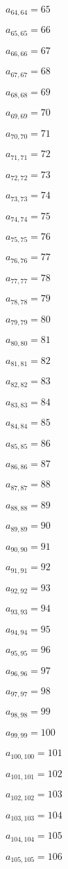 \documentclass[a4paper,12pt]{article}
\begin{document}
$a _{ 64, 64 } = 65$

$a _{ 65, 65 } = 66$

$a _{ 66, 66 } = 67$

$a _{ 67, 67 } = 68$

$a _{ 68, 68 } = 69$

$a _{ 69, 69 } = 70$

$a _{ 70, 70 } = 71$

$a _{ 71, 71 } = 72$

$a _{ 72, 72 } = 73$

$a _{ 73, 73 } = 74$

$a _{ 74, 74 } = 75$

$a _{ 75, 75 } = 76$

$a _{ 76, 76 } = 77$

$a _{ 77, 77 } = 78$

$a _{ 78, 78 } = 79$

$a _{ 79, 79 } = 80$

$a _{ 80, 80 } = 81$

$a _{ 81, 81 } = 82$

$a _{ 82, 82 } = 83$

$a _{ 83, 83 } = 84$

$a _{ 84, 84 } = 85$

$a _{ 85, 85 } = 86$

$a _{ 86, 86 } = 87$

$a _{ 87, 87 } = 88$

$a _{ 88, 88 } = 89$

$a _{ 89, 89 } = 90$

$a _{ 90, 90 } = 91$

$a _{ 91, 91 } = 92$

$a _{ 92, 92 } = 93$

$a _{ 93, 93 } = 94$

$a _{ 94, 94 } = 95$

$a _{ 95, 95 } = 96$

$a _{ 96, 96 } = 97$

$a _{ 97, 97 } = 98$

$a _{ 98, 98 } = 99$

$a _{ 99, 99 } = 100$

$a _{ 100, 100 } = 101$

$a _{ 101, 101 } = 102$

$a _{ 102, 102 } = 103$

$a _{ 103, 103 } = 104$

$a _{ 104, 104 } = 105$

$a _{ 105, 105 } = 106$
\end{document}
